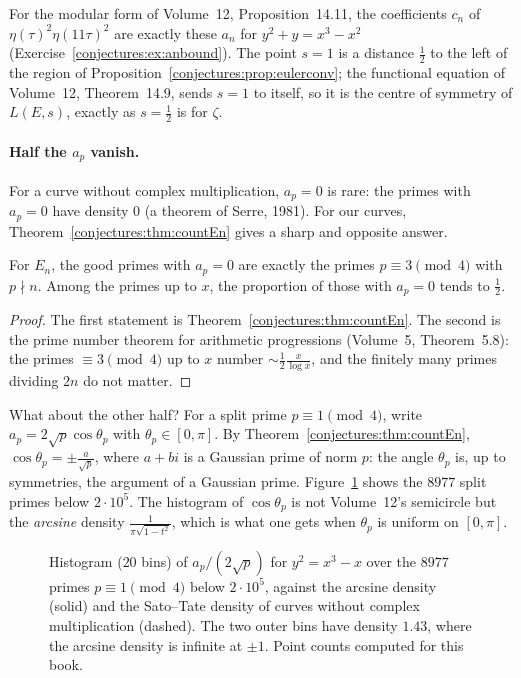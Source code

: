 For the modular form of Volume~12, Proposition~14.11, the coefficients $c_n$ of $\eta(\tau)^2\eta(11\tau)^2$ are exactly these $a_n$ for $y^2+y=x^3-x^2$
(Exercise~\ref{conjectures:ex:anbound}). The point $s=1$ is a distance $\frac12$ to the left of the region of Proposition~\ref{conjectures:prop:eulerconv}; the functional equation
of Volume~12, Theorem~14.9, sends $s=1$ to itself, so it is the centre of symmetry of $L(E,s)$, exactly as $s=\frac12$ is for $\zeta$.

\paragraph{Half the $a_p$ vanish.} For a curve without complex multiplication, $a_p=0$ is rare: the primes with $a_p=0$ have density $0$ (a theorem of Serre,
1981). For our curves, Theorem~\ref{conjectures:thm:countEn} gives a sharp and opposite answer.

\begin{corollary}\label{conjectures:cor:cmhalf}
For $E_n$, the good primes with $a_p=0$ are exactly the primes $p\equiv3\pmod4$ with $p\nmid n$. Among the primes up to $x$, the proportion of those with
$a_p=0$ tends to $\frac12$.
\end{corollary}
\begin{proof}
The first statement is Theorem~\ref{conjectures:thm:countEn}. The second is the prime number theorem for arithmetic progressions (Volume~5, Theorem~5.8): the primes
$\equiv3\pmod4$ up to $x$ number $\sim\frac12\frac x{\log x}$, and the finitely many primes dividing $2n$ do not matter.
\end{proof}

What about the other half? For a split prime $p\equiv1\pmod4$, write $a_p=2\sqrt p\cos\theta_p$ with $\theta_p\in[0,\pi]$. By Theorem~\ref{conjectures:thm:countEn},
$\cos\theta_p=\pm\frac a{\sqrt p}$, where $a+bi$ is a Gaussian prime of norm $p$: the angle $\theta_p$ is, up to symmetries, the argument of a Gaussian prime.
Figure~\ref{conjectures:fig:cm} shows the $8977$ split primes below $2\cdot10^5$. The histogram of $\cos\theta_p$ is not Volume~12's semicircle but the \emph{arcsine}
density $\frac1{\pi\sqrt{1-t^2}}$, which is what one gets when $\theta_p$ is uniform on $[0,\pi]$.

\begin{figure}[ht]
\centering
{}
\caption{Histogram ($20$ bins) of $a_p/(2\sqrt p)$ for $y^2=x^3-x$ over the $8977$ primes $p\equiv1\pmod4$ below $2\cdot10^5$, against the arcsine density
(solid) and the Sato--Tate density of curves without complex multiplication (dashed). The two outer bins have density $1.43$, where the arcsine density
is infinite at $\pm1$. Point counts computed for this book.}
\label{conjectures:fig:cm}
\end{figure}

